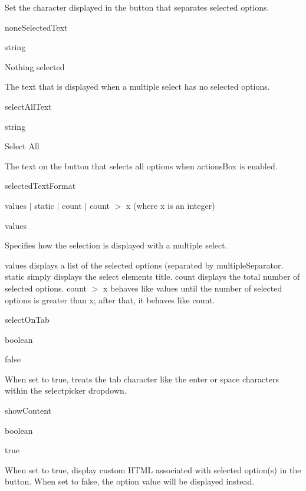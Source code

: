 Set the character displayed in the button that separates selected options.

none\+Selected\+Text 

string 

{\ttfamily \textquotesingle{}Nothing selected\textquotesingle{}} 

The text that is displayed when a multiple select has no selected options.

select\+All\+Text 

string 

{\ttfamily \textquotesingle{}Select All\textquotesingle{}} 

The text on the button that selects all options when {\ttfamily actions\+Box} is enabled.

selected\+Text\+Format 

{\ttfamily \textquotesingle{}values\textquotesingle{}} $\vert$ {\ttfamily \textquotesingle{}static\textquotesingle{}} $\vert$ {\ttfamily \textquotesingle{}count\textquotesingle{}} $\vert$ {\ttfamily \textquotesingle{}count $>$ x\textquotesingle{}} (where x is an integer) 

{\ttfamily \textquotesingle{}values\textquotesingle{}} 

Specifies how the selection is displayed with a multiple select.

{\ttfamily \textquotesingle{}values\textquotesingle{}} displays a list of the selected options (separated by {\ttfamily multiple\+Separator}. {\ttfamily \textquotesingle{}static\textquotesingle{}} simply displays the select element\textquotesingle{}s title. {\ttfamily \textquotesingle{}count\textquotesingle{}} displays the total number of selected options. {\ttfamily \textquotesingle{}count $>$ x\textquotesingle{}} behaves like {\ttfamily \textquotesingle{}values\textquotesingle{}} until the number of selected options is greater than x; after that, it behaves like {\ttfamily \textquotesingle{}count\textquotesingle{}}.   

select\+On\+Tab 

boolean 

{\ttfamily false} 

When set to {\ttfamily true}, treats the tab character like the enter or space characters within the selectpicker dropdown.

show\+Content 

boolean 

{\ttfamily true} 

When set to {\ttfamily true}, display custom H\+T\+ML associated with selected option(s) in the button. When set to {\ttfamily false}, the option value will be displayed instead.

